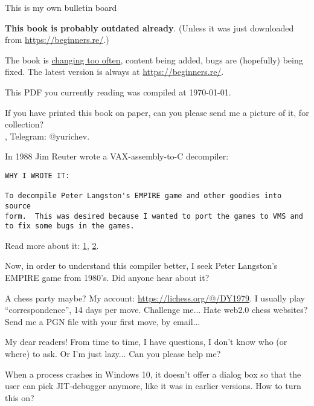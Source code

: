 
\begin{center}
\LARGE{} This is my own bulletin board \normalsize{}
\end{center}

\textbf{This book is probably outdated already}.
(Unless it was just downloaded from \url{https://beginners.re/}.)

The book is \href{\RepoURL/ChangeLog}{changing too often},
content being added, bugs are (hopefully) being fixed.
The latest version is always at \url{https://beginners.re/}.

This PDF you currently reading was compiled at \today{}.

\myhrule{}

If you have printed this book on paper, can you please send me a picture of it, for collection?\\
\EMAIL{}, Telegram: @yurichev.

\myhrule{}

In 1988 Jim Reuter wrote a VAX-assembly-to-C decompiler:

\begin{lstlisting}
WHY I WROTE IT:

To decompile Peter Langston's EMPIRE game and other goodies into source
form.  This was desired because I wanted to port the games to VMS and
to fix some bugs in the games.
\end{lstlisting}

Read more about it:
\href{http://www.program-transformation.org/Transform/DecompReadMe}{1},
\href{http://www.program-transformation.org/Transform/DecompDecompiler}{2}.

Now, in order to understand this compiler better, I seek Peter Langston's EMPIRE game from 1980's.
Did anyone hear about it?

\myhrule{}

A chess party maybe?
My account: \url{https://lichess.org/@/DY1979}.
I usually play ``correspondence'', 14 days per move.
Challenge me...
Hate web2.0 chess websites? Send me a PGN file with your first move, by email...

\myhrule{}

My dear readers! From time to time, I have questions, I don't know who (or where) to ask.
Or I'm just lazy...
Can you please help me?

\myhrule{}

When a process crashes in Windows 10, it doesn't offer a dialog box so that the user can pick JIT-debugger anymore,
like it was in earlier versions.
How to turn this on?

